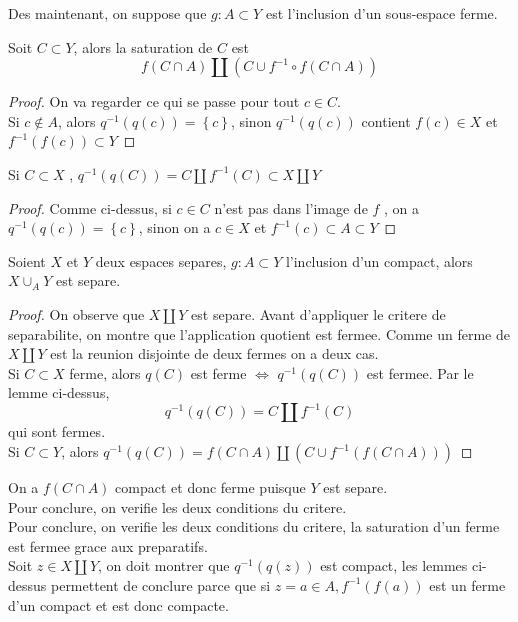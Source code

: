 \documentclass[../main.tex]{subfiles}
\begin{document}
Des maintenant, on suppose que $g: A \subset Y $ est l'inclusion d'un sous-espace ferme.
\begin{lemma}
Soit $C \subset Y$, alors la saturation de $C$ est
\[ 
f( C\cap A) \coprod ( C\cup f^{-1}\circ f( C\cap A) ) 
\]


\end{lemma}
\begin{proof}
On va regarder ce qui se passe pour tout $c\in C$.\\
Si $c\notin A$, alors $q^{-1}( q( c) ) = \left\{ c \right\} $, sinon $q^{-1}( q( c) ) $ contient $f( c) \in X$ et $f^{-1}( f( c) ) \subset Y$ 
\end{proof}
\begin{lemma}
Si $C \subset X$ , $q^{-1}( q( C) ) = C \coprod f^{-1}( C) \subset X\coprod Y$ 
\end{lemma}
\begin{proof}
Comme ci-dessus, si $c\in C$ n'est pas dans l'image de $f$ , on a $q^{-1}( q( c) ) = \left\{ c \right\} $, sinon on a $c\in X$ et $f^{-1}( c) \subset A \subset Y$ 
\end{proof}
\begin{propo}
Soient $X$ et $Y$ deux espaces separes, $g : A \subset Y$ l'inclusion d'un compact, alors $X\cup_A Y$ est separe.
\end{propo}
\begin{proof}
On observe que $X\coprod Y$ est separe. Avant d'appliquer le critere de separabilite, on montre que l'application quotient est fermee. Comme un ferme de $X\coprod Y$ est la reunion disjointe de deux fermes on a deux cas.\\
Si $C \subset X$ ferme, alors $q( C) $ est ferme $\iff$ $q^{-1}( q( C) ) $ est fermee. Par le lemme ci-dessus,
\[ 
q^{-1}( q( C) ) = C \coprod f^{-1}( C) 
\]
qui sont fermes.\\
Si $C \subset Y$, alors $q^{-1}( q( C) ) = f( C\cap A)  \coprod ( C \cup f^{-1}( f( C\cap A) ) ) $ 
\end{proof}
On a $f( C\cap A) $ compact et donc ferme puisque $Y$ est separe.\\
Pour conclure, on verifie les deux conditions du critere.\\
Pour conclure, on verifie les deux conditions du critere, la saturation d'un ferme est fermee grace aux preparatifs.\\
Soit $z\in X\coprod Y$, on doit montrer que $q^{-1}( q( z) ) $ est compact, les lemmes ci-dessus permettent de conclure parce que si $z=a\in A, f^{-1}( f( a) ) $ est un ferme d'un compact et est donc compacte.	
\end{document}
